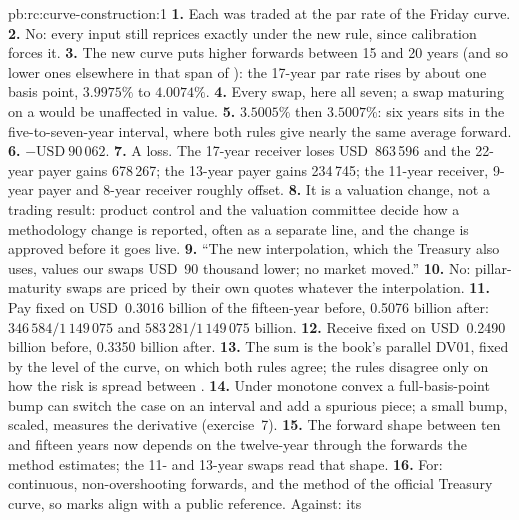 \begin{solution}{pb:rc:curve-construction:1}
\textbf{1.} Each was traded at the par rate of the Friday curve.
\textbf{2.} No: every input still reprices exactly under the new rule, since
calibration forces it.
\textbf{3.} The new curve puts higher forwards between 15 and 20 years (and so
lower ones elsewhere in that span of ): the 17-year par rate rises by
about one basis point, $3.9975\%$ to $4.0074\%$.
\textbf{4.} Every  swap, here all seven; a swap maturing on a 
would be unaffected in value.
\textbf{5.} $3.5005\%$ then $3.5007\%$: six years sits in the five-to-seven-year
interval, where both rules give nearly the same average forward.
\textbf{6.} $-\text{USD}~90\,062$.
\textbf{7.} A loss. The 17-year receiver loses USD~863\,596 and the 22-year payer
gains 678\,267; the 13-year payer gains 234\,745; the 11-year receiver, 9-year
payer and 8-year receiver roughly offset.
\textbf{8.} It is a valuation change, not a trading result: product control and
the valuation committee decide how a methodology change is reported, often as a
separate line, and the change is approved before it goes live.
\textbf{9.} ``The new interpolation, which the Treasury also uses, values our
 swaps USD~90 thousand lower; no market moved.''
\textbf{10.} No: pillar-maturity swaps are priced by their own quotes whatever the
interpolation.
\textbf{11.} Pay fixed on USD~0.3016 billion of the fifteen-year before, 0.5076
billion after: $346\,584/1\,149\,075$ and $583\,281/1\,149\,075$ billion.
\textbf{12.} Receive fixed on USD~0.2490 billion before, 0.3350 billion after.
\textbf{13.} The sum is the book's parallel DV01, fixed by the level of the curve,
on which both rules agree; the rules disagree only on how the risk is spread
between .
\textbf{14.} Under monotone convex a full-basis-point bump can switch the case on
an interval and add a spurious piece; a small bump, scaled, measures the
derivative (exercise~7).
\textbf{15.} The forward shape between ten and fifteen years now depends on the
twelve-year  through the  forwards the method estimates; the 11-
and 13-year swaps read that shape.
\textbf{16.} For: continuous, non-overshooting forwards, and the method of the
official Treasury curve, so marks align with a public reference. Against: its

\end{solution}
